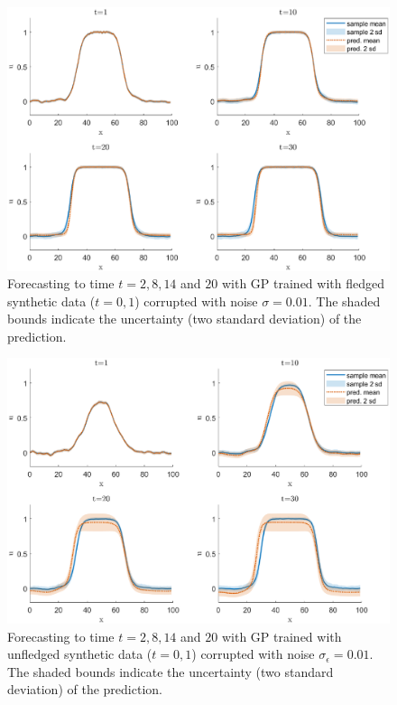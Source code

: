 \documentclass[smallextended,natbib]{svjour3}       %
\begin{document}
\begin{figure}[h]
\centerline{\includegraphics[width=\textwidth]{chapterGP/figures/bistable-noi2}}
\caption{\label{fig:u subplot ic1}  Forecasting to time $t=2,8,14$ and $20$ with GP trained with fledged synthetic data ($t=0,1$) corrupted with noise $\sigma=0.01$. The shaded bounds indicate the uncertainty (two standard deviation) of the prediction.} 
\end{figure}


\begin{figure}[h]
\centerline{\includegraphics[width=\textwidth]{chapterGP/figures/bistable-noi-short2}}
\caption{\label{fig:u subplot ic2} Forecasting to time $t=2,8,14$ and $20$ with GP trained with unfledged synthetic data ($t=0,1$) corrupted with noise $\sigma_{\epsilon}=0.01$. The shaded bounds indicate the uncertainty (two standard deviation) of the prediction.}
\end{figure}
\end{document}
